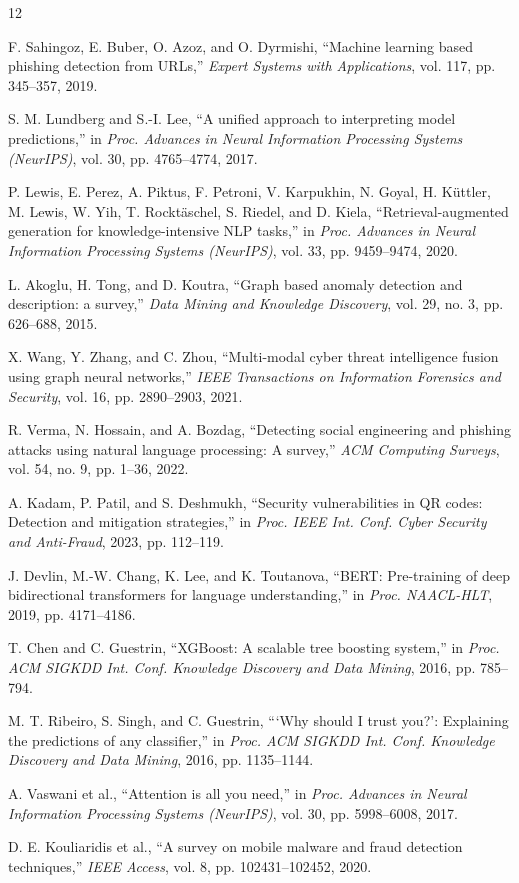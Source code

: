\documentclass[conference,a4paper]{IEEEtran}
\begin{document}
\begin{thebibliography}{12}

F. Sahingoz, E. Buber, O. Azoz, and O. Dyrmishi, ``Machine learning based phishing detection from URLs,'' \textit{Expert Systems with Applications}, vol. 117, pp. 345--357, 2019.

S. M. Lundberg and S.-I. Lee, ``A unified approach to interpreting model predictions,'' in \textit{Proc. Advances in Neural Information Processing Systems (NeurIPS)}, vol. 30, pp. 4765--4774, 2017.

P. Lewis, E. Perez, A. Piktus, F. Petroni, V. Karpukhin, N. Goyal, H. Küttler, M. Lewis, W. Yih, T. Rocktäschel, S. Riedel, and D. Kiela, ``Retrieval-augmented generation for knowledge-intensive NLP tasks,'' in \textit{Proc. Advances in Neural Information Processing Systems (NeurIPS)}, vol. 33, pp. 9459--9474, 2020.

L. Akoglu, H. Tong, and D. Koutra, ``Graph based anomaly detection and description: a survey,'' \textit{Data Mining and Knowledge Discovery}, vol. 29, no. 3, pp. 626--688, 2015.

X. Wang, Y. Zhang, and C. Zhou, ``Multi-modal cyber threat intelligence fusion using graph neural networks,'' \textit{IEEE Transactions on Information Forensics and Security}, vol. 16, pp. 2890--2903, 2021.

R. Verma, N. Hossain, and A. Bozdag, ``Detecting social engineering and phishing attacks using natural language processing: A survey,'' \textit{ACM Computing Surveys}, vol. 54, no. 9, pp. 1--36, 2022.

A. Kadam, P. Patil, and S. Deshmukh, ``Security vulnerabilities in QR codes: Detection and mitigation strategies,'' in \textit{Proc. IEEE Int. Conf. Cyber Security and Anti-Fraud}, 2023, pp. 112--119.

J. Devlin, M.-W. Chang, K. Lee, and K. Toutanova, ``BERT: Pre-training of deep bidirectional transformers for language understanding,'' in \textit{Proc. NAACL-HLT}, 2019, pp. 4171--4186.

T. Chen and C. Guestrin, ``XGBoost: A scalable tree boosting system,'' in \textit{Proc. ACM SIGKDD Int. Conf. Knowledge Discovery and Data Mining}, 2016, pp. 785--794.

M. T. Ribeiro, S. Singh, and C. Guestrin, ```Why should I trust you?': Explaining the predictions of any classifier,'' in \textit{Proc. ACM SIGKDD Int. Conf. Knowledge Discovery and Data Mining}, 2016, pp. 1135--1144.

A. Vaswani et al., ``Attention is all you need,'' in \textit{Proc. Advances in Neural Information Processing Systems (NeurIPS)}, vol. 30, pp. 5998--6008, 2017.

D. E. Kouliaridis et al., ``A survey on mobile malware and fraud detection techniques,'' \textit{IEEE Access}, vol. 8, pp. 102431--102452, 2020.

\end{thebibliography}
\end{document}
